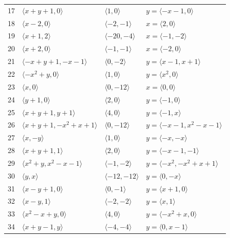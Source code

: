 \documentclass[11pt]{article}
\begin{document}
\begin{longtable}{@{}rlll@{}}
17 & $\langle x+y+1,0\rangle$ & $\langle 1,0\rangle$ & $y=\langle -x-1,0\rangle$\\
18 & $\langle x-2,0\rangle$ & $\langle -2,-1\rangle$ & $x=\langle 2,0\rangle$\\
19 & $\langle x+1,2\rangle$ & $\langle -20,-4\rangle$ & $x=\langle -1,-2\rangle$\\
20 & $\langle x+2,0\rangle$ & $\langle -1,-1\rangle$ & $x=\langle -2,0\rangle$\\
21 & $\langle -x+y+1,-x-1\rangle$ & $\langle 0,-2\rangle$ & $y=\langle x-1,x+1\rangle$\\
22 & $\langle -x^{2}+y,0\rangle$ & $\langle 1,0\rangle$ & $y=\langle x^{2},0\rangle$\\
23 & $\langle x,0\rangle$ & $\langle 0,-12\rangle$ & $x=\langle 0,0\rangle$\\
24 & $\langle y+1,0\rangle$ & $\langle 2,0\rangle$ & $y=\langle -1,0\rangle$\\
25 & $\langle x+y+1,y+1\rangle$ & $\langle 4,0\rangle$ & $y=\langle -1,x\rangle$\\
26 & $\langle x+y+1,-x^{2}+x+1\rangle$ & $\langle 0,-12\rangle$ & $y=\langle -x-1,x^{2}-x-1\rangle$\\
27 & $\langle x,-y\rangle$ & $\langle 1,0\rangle$ & $y=\langle -x,-x\rangle$\\
28 & $\langle x+y+1,1\rangle$ & $\langle 2,0\rangle$ & $y=\langle -x-1,-1\rangle$\\
29 & $\langle x^{2}+y,x^{2}-x-1\rangle$ & $\langle -1,-2\rangle$ & $y=\langle -x^{2},-x^{2}+x+1\rangle$\\
30 & $\langle y,x\rangle$ & $\langle -12,-12\rangle$ & $y=\langle 0,-x\rangle$\\
31 & $\langle x-y+1,0\rangle$ & $\langle 0,-1\rangle$ & $y=\langle x+1,0\rangle$\\
32 & $\langle x-y,1\rangle$ & $\langle -2,-2\rangle$ & $y=\langle x,1\rangle$\\
33 & $\langle x^{2}-x+y,0\rangle$ & $\langle 4,0\rangle$ & $y=\langle -x^{2}+x,0\rangle$\\
34 & $\langle x+y-1,y\rangle$ & $\langle -4,-4\rangle$ & $y=\langle 0,x-1\rangle$\\
\end{longtable}
\endgroup
\end{document}
